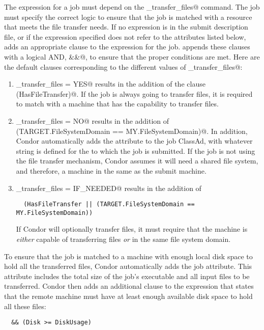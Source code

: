 The  expression for a job must depend
on the \verb@should_transfer_files@ command.
The job must specify the correct logic to ensure that the job is matched
with a resource that meets the file transfer needs.
If no  expression is in the submit description file,
or if the expression specified does not refer to the
attributes listed below,  adds an
appropriate clause to the  expression for the job.
 appends these clauses with a logical AND, \verb@&&@,
to ensure that the proper conditions are met.
Here are the default clauses corresponding to the different values of
\verb@should_transfer_files@:

\begin{enumerate}

\item 
\verb@should_transfer_files = YES@ results in the addition of
the clause \verb@(HasFileTransfer)@.
  If the job is always going to transfer files, it is required to 
  match with a machine that has the capability to transfer files.

\item 
\verb@should_transfer_files = NO@ results in the addition of
  \verb@(TARGET.FileSystemDomain == MY.FileSystemDomain)@.
  In addition, Condor automatically adds the
   attribute to the job ClassAd, with whatever
  string is defined for the  to which the job is
  submitted.
  If the job is not using the file transfer mechanism, Condor assumes
  it will need a shared file system, and therefore, a machine in the
  same  as the submit machine.

\item \verb@should_transfer_files = IF_NEEDED@ results in the addition of
\footnotesize
\begin{verbatim}
  (HasFileTransfer || (TARGET.FileSystemDomain == MY.FileSystemDomain))
\end{verbatim}
\normalsize
  If Condor will optionally transfer files, it must require
  that the machine is \emph{either} capable of transferring files
  \emph{or} in the same file system domain.

\end{enumerate}

To ensure that the job is matched to a machine with enough local disk
space to hold all the transferred files, Condor automatically adds the
 job attribute.
This attribute includes the total
size of the job's executable and all input files to be transferred.
Condor then adds an additional clause to the 
expression that states that the remote machine must have at least
enough available disk space to hold all these files:
\begin{verbatim}
  && (Disk >= DiskUsage)
\end{verbatim}

